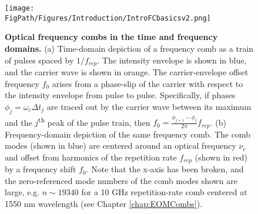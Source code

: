 \begin{figure}[htpb]
	\begin{center}
		\texttt{[image: \\FigPath/Figures/Introduction/IntroFCbasicsv2.png]}
	\end{center}
	\caption[Optical frequency combs in the time and frequency domains]{\textbf{Optical frequency combs in the time and frequency domains.} (a) Time-domain depiction of a frequency comb as a train of pulses spaced by $1/f_{rep}$. The intensity envelope is shown in blue, and the carrier wave is shown in orange. The carrier-envelope offset frequency $f_0$ arises from a phase-slip of the carrier with respect to the intensity envelope from pulse to pulse. Specifically, if phases $\phi_j=\omega_c\Delta t_j$ are traced out by the carrier wave between its maximum and the $j$\textsuperscript{th} peak of the pulse train, then $f_0=\frac{\phi_{j+1}-\phi_j}{2\pi}f_{rep}$. (b) Frequency-domain depiction of the same frequency comb. The comb modes (shown in blue) are centered around an optical frequency $\nu_c$ and offset from harmonics of the repetition rate $f_{rep}$ (shown in red) by a frequency shift $f_0$. Note that the x-axis has been broken, and the zero-referenced mode numbers of the comb modes shown are large, e.g. $n\sim19340$ for a 10 GHz repetition-rate comb centered at 1550 nm wavelength (see Chapter \ref{chap:EOMCombs}). }
	\label{fig:CombBasics}
\end{figure} 



